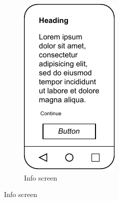 \begin{figure}
    \centering
    \begin{subfigure}[b]{0.25\textwidth}
        \centering
        \includegraphics[width=\textwidth]{content/05_design_and_dev_artefacts/ActivityInfoScreen.drawio.pdf}
        \caption{Info screen}
        \label{subfig:InfoScreen}
    \end{subfigure}
    \hspace{1cm}

\end{figure}
